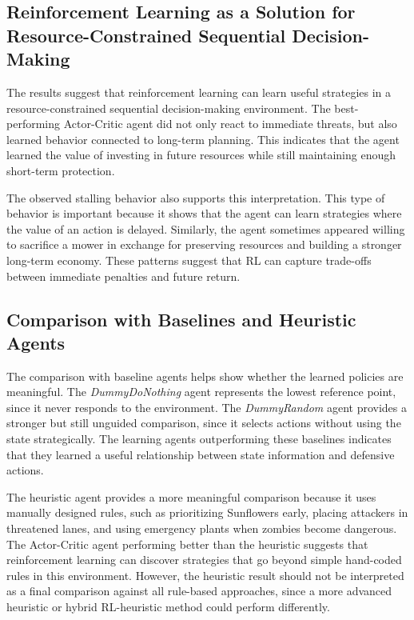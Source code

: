 \documentclass[conference,onecolumn]{IEEEtran}
\begin{document}
\subsection{Reinforcement Learning as a Solution for Resource-Constrained Sequential Decision-Making}

The results suggest that reinforcement learning can learn useful strategies in a resource-constrained sequential decision-making environment. The best-performing Actor-Critic agent did not only react to immediate threats, but also learned behavior connected to long-term planning. This indicates that the agent learned the value of investing in future resources while still maintaining enough short-term protection.

The observed stalling behavior also supports this interpretation. This type of behavior is important because it shows that the agent can learn strategies where the value of an action is delayed. Similarly, the agent sometimes appeared willing to sacrifice a mower in exchange for preserving resources and building a stronger long-term economy. These patterns suggest that RL can capture trade-offs between immediate penalties and future return.

\subsection{Comparison with Baselines and Heuristic Agents}

The comparison with baseline agents helps show whether the learned policies are meaningful. The \textit{DummyDoNothing} agent represents the lowest reference point, since it never responds to the environment. The \textit{DummyRandom} agent provides a stronger but still unguided comparison, since it selects actions without using the state strategically. The learning agents outperforming these baselines indicates that they learned a useful relationship between state information and defensive actions.

The heuristic agent provides a more meaningful comparison because it uses manually designed rules, such as prioritizing Sunflowers early, placing attackers in threatened lanes, and using emergency plants when zombies become dangerous. The Actor-Critic agent performing better than the heuristic suggests that reinforcement learning can discover strategies that go beyond simple hand-coded rules in this environment. However, the heuristic result should not be interpreted as a final comparison against all rule-based approaches, since a more advanced heuristic or hybrid RL-heuristic method could perform differently.
\end{document}
